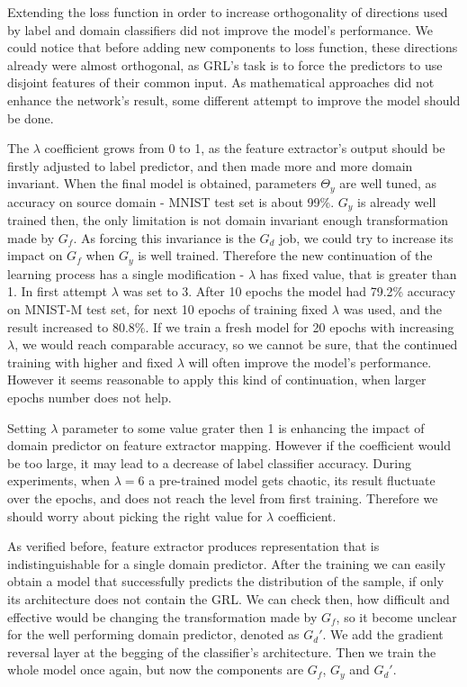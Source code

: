 \documentclass{article}
\begin{document}
\par
Extending the loss function in order to increase orthogonality of directions used by label and domain classifiers did not improve the model's performance. We could notice that before adding new components to loss function, these directions already were almost orthogonal, as GRL's task is to force the predictors to use disjoint features of their common input. As mathematical approaches did not enhance the network's result, some different attempt to improve the model should be done.
\par
The $\lambda$ coefficient grows from 0 to 1, as the feature extractor's output should be firstly adjusted to label predictor, and then made more and more domain invariant. When the final model is obtained, parameters $\Theta_{y}$ are well tuned, as accuracy on source domain - MNIST test set is about 99\%. $G_{y}$ is already well trained then, the only limitation is not domain invariant enough transformation made by $G_{f}$. As forcing this invariance is the $G_{d}$ job, we could try to increase its impact on $G_{f}$ when $G_{y}$ is well trained. Therefore the new continuation of the learning process has a single modification - $\lambda$ has fixed value, that is greater than 1. In first attempt $\lambda$ was set to 3. After 10 epochs the model had 79.2\% accuracy on MNIST-M test set, for next 10 epochs of training fixed $\lambda$ was used, and the result increased to 80.8\%. If we train a fresh model for 20 epochs with increasing $\lambda$, we would reach comparable accuracy, so we cannot be sure, that the continued training with higher and fixed $\lambda$ will often improve the model's performance. However it seems reasonable to apply this kind of continuation, when larger epochs number does not help.
\par
Setting $\lambda$ parameter to some value grater then 1 is enhancing the impact of domain predictor on feature extractor mapping. However if the coefficient would be too large, it may lead to a decrease of label classifier accuracy. During experiments, when $\lambda = 6$ a pre-trained model gets chaotic, its result fluctuate over the epochs, and does not reach the level from first training. Therefore we should worry about picking the right value for $\lambda$ coefficient.
\par
As verified before, feature extractor produces representation that is indistinguishable for a single domain predictor. After the training we can easily obtain a model that successfully predicts the distribution of the sample, if only its architecture does not contain the GRL. We can check then, how difficult and effective would be changing the transformation made by $G_{f}$, so it become unclear for the well performing domain predictor, denoted as $G_{d}'$. We add the gradient reversal layer at the begging of the classifier's architecture. Then we train the whole model once again, but now the components are $G_{f}$, $G_{y}$ and $G_{d}'$. 
\end{document}
